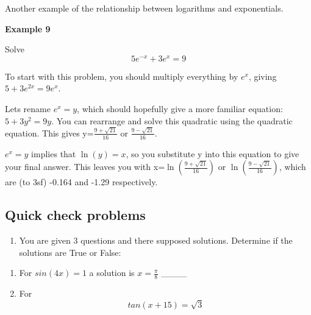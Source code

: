 \documentclass[
  12pt,
  a4paper, oneside]{starmastarticle}
\providecommand{\tightlist}{%
  \setlength{\itemsep}{0pt}\setlength{\parskip}{0pt}}\usepackage{longtable,booktabs,array}
\begin{document}
Another example of the relationship between logarithms and exponentials.

\begin{tcolorbox}[enhanced jigsaw, leftrule=.75mm, rightrule=.15mm, breakable, left=2mm, colback=white, bottomrule=.15mm, arc=.35mm, toprule=.15mm, opacityback=0, colframe=quarto-callout-note-color-frame]
\begin{minipage}[t]{5.5mm}
\textcolor{quarto-callout-note-color}{\faInfo}
\end{minipage}%
\begin{minipage}[t]{\textwidth - 5.5mm}

\textbf{Example 9}\vspace{2mm}

Solve \[5e^{-x}+3e^x=9\]

To start with this problem, you should multiply everything by \(e^x\),
giving \(5+3e^{2x}=9e^x\).

Lets rename \(e^x=y\), which should hopefully give a more familiar
equation: \(5+3y^2=9y\). You can rearrange and solve this quadratic
using the quadratic equation. This gives y=\(\frac{9+\sqrt{21}}{16}\) or
\(\frac{9-\sqrt{21}}{16}\).

\(e^x=y\) implies that \(\ln(y)=x\), so you substitute y into this
equation to give your final answer. This leaves you with
x=\(\ln{(\frac{9+\sqrt{21}}{16})}\) or
\(\ln{(\frac{9-\sqrt{21}}{16})}\), which are (to 3sf) -0.164 and -1.29
respectively.

\end{minipage}%
\end{tcolorbox}

\hypertarget{quick-check-problems}{%
\subsection*{Quick check problems}\label{quick-check-problems}}

\begin{enumerate}
\def\labelenumi{\arabic{enumi}.}
\tightlist
\item
  You are given 3 questions and there supposed solutions. Determine if
  the solutions are True or False:
\end{enumerate}

\begin{enumerate}
\def\labelenumi{\alph{enumi})}
\item
  For \(sin(4x)= 1\) a solution is \(x =\frac{\pi}{8}\) \_\_\_\_
\item
  For \[tan(x+15)=\sqrt{3}\]
\end{enumerate}
\end{document}
